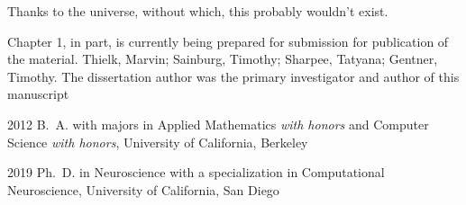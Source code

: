 \begin{frontmatter}
%
%
\begin{acknowledgements}
 Thanks to the universe, without which, this probably wouldn't exist.
 
 Chapter 1, in part, is currently being prepared for submission for publication of the material. Thielk, Marvin; Sainburg, Timothy; Sharpee, Tatyana; Gentner, Timothy. The dissertation author was the primary investigator and author of this manuscript
\end{acknowledgements}


%
%
\begin{vitapage}
\begin{vita}
  \item[2012] B.~A. with majors in Applied Mathematics \emph{with honors} and Computer Science \emph{with honors}, University of California, Berkeley
  \item[2019] Ph.~D. in Neuroscience with a specialization in Computational Neuroscience, University of California, San Diego
\end{vita}
\end{vitapage}



\end{frontmatter}
